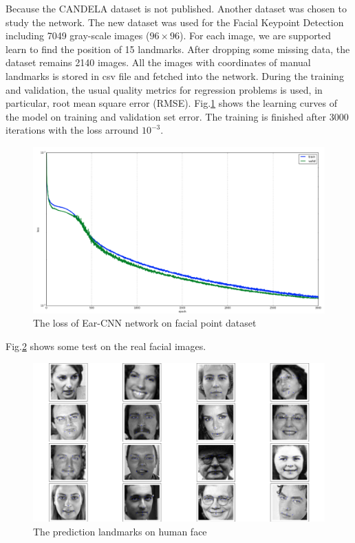 \documentclass[12pt,a4paper]{article}
\begin{document}
Because the CANDELA dataset is not published. Another dataset was chosen to study the network. The new dataset was used for the Facial Keypoint Detection including 7049 gray-scale images ($96 \times 96$). For each image, we are supported learn to find the position of 15 landmarks. After dropping some missing data, the dataset remains 2140 images. All the images with coordinates of manual landmarks is stored in csv file and fetched into the network. During the training and validation, the usual quality metrics for regression problems is used, in particular, root mean square error (RMSE). Fig.\ref{earLosstrain} shows the learning curves of the model on training and validation set error. The training is finished after 3000 iterations with the loss arround $10^{-3}$.
\begin{figure}[h!]
	\centering
	\includegraphics[scale=0.27]{images/trainloss}
	\caption{The loss of Ear-CNN network on facial point dataset}
	\label{earLosstrain}
\end{figure}
Fig.\ref{earTest} shows some test on the real facial images.
\begin{figure}[h!]
	\centering
	\includegraphics[scale=0.27]{images/figure_1-1.png}
	\caption{The prediction landmarks on human face}
	\label{earTest}
\end{figure}
\end{document}
